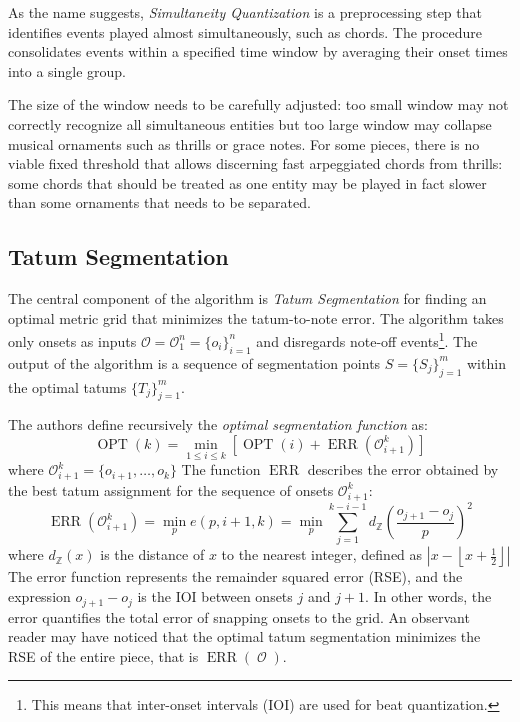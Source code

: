 As the name suggests, \emph{Simultaneity Quantization} is a preprocessing step that identifies events played almost simultaneously, such as chords. The procedure consolidates events within a specified time window by averaging their onset times into a single group.

The size of the window needs to be carefully adjusted: too small window may not correctly recognize all simultaneous entities but too large window may collapse musical ornaments such as thrills or grace notes. For some pieces, there is no viable fixed threshold that allows discerning fast arpeggiated chords from thrills: some chords that should be treated as one entity may be played in fact slower than some ornaments that needs to be separated.

\subsection{Tatum Segmentation}

The central component of the algorithm is \emph{Tatum Segmentation} for finding an optimal metric grid that minimizes the tatum-to-note error. The algorithm takes only onsets as inputs $\mathcal{O}=\mathcal{O}_1^n=\{o_i\}_{i=1}^n$ and disregards note-off events\footnote{This means that inter-onset intervals (IOI) are used for beat quantization.}. The output of the algorithm is a sequence of segmentation points $S=\{S_j\}_{j=1}^m$ within the optimal tatums $\{T_j\}_{j=1}^m$.

The authors define recursively the \emph{optimal segmentation function} as: \[\operatorname{OPT}(k) = \min_{1\leq i \leq k}\left[\operatorname{OPT}(i) + \operatorname{ERR}\left(\mathcal{O}_{i+1}^k\right)\right]\] where $\mathcal{O}_{i+1}^k=\{o_{i+1},\ldots,o_k\}$ The function $\operatorname{ERR}$ describes the error obtained by the best tatum assignment for the sequence of onsets $\mathcal{O}_{i+1}^k$: \[\operatorname{ERR}\left(\mathcal{O}_{i+1}^k\right)=\min_p e\left(p,i+1,k\right)=\min_p \sum_{j=1}^{k-i-1}d_{\mathbb{Z}}\left(\frac{o_{j+1}-o_j}{p}\right)^2\] where $d_{\mathbb{Z}}(x)$ is the distance of $x$ to the nearest integer, defined as $\left|x - \left\lfloor x + \tfrac{1}{2}\right\rfloor\right|$ The error function represents the remainder squared error (RSE), and the expression $o_{j+1}-o_j$ is the IOI between onsets $j$ and $j+1$. In other words, the error quantifies the total error of snapping onsets to the grid. An observant reader may have noticed that the optimal tatum segmentation minimizes the RSE of the entire piece, that is $\operatorname{ERR}\left(\operatorname{\mathcal{O}}\right)$.

